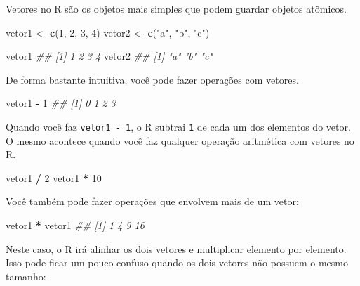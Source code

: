 \documentclass[]{book}
\newenvironment{Shaded}{\begin{snugshade}}{\end{snugshade}}
\newcommand{\CommentTok}[1]{\textcolor[rgb]{0.56,0.35,0.01}{\textit{#1}}}
\newcommand{\DecValTok}[1]{\textcolor[rgb]{0.00,0.00,0.81}{#1}}
\newcommand{\KeywordTok}[1]{\textcolor[rgb]{0.13,0.29,0.53}{\textbf{#1}}}
\newcommand{\NormalTok}[1]{#1}
\newcommand{\OperatorTok}[1]{\textcolor[rgb]{0.81,0.36,0.00}{\textbf{#1}}}
\newcommand{\StringTok}[1]{\textcolor[rgb]{0.31,0.60,0.02}{#1}}
\begin{document}
Vetores no R são os objetos mais simples que podem guardar objetos atômicos.

\begin{Shaded}
\begin{Highlighting}[]
\NormalTok{vetor1 <-}\StringTok{ }\KeywordTok{c}\NormalTok{(}\DecValTok{1}\NormalTok{, }\DecValTok{2}\NormalTok{, }\DecValTok{3}\NormalTok{, }\DecValTok{4}\NormalTok{)}
\NormalTok{vetor2 <-}\StringTok{ }\KeywordTok{c}\NormalTok{(}\StringTok{"a"}\NormalTok{, }\StringTok{"b"}\NormalTok{, }\StringTok{"c"}\NormalTok{)}

\NormalTok{vetor1}
\CommentTok{## [1] 1 2 3 4}
\NormalTok{vetor2}
\CommentTok{## [1] "a" "b" "c"}
\end{Highlighting}
\end{Shaded}

De forma bastante intuitiva, você pode fazer operações com vetores.

\begin{Shaded}
\begin{Highlighting}[]
\NormalTok{vetor1 }\OperatorTok{-}\StringTok{ }\DecValTok{1}
\CommentTok{## [1] 0 1 2 3}
\end{Highlighting}
\end{Shaded}

Quando você faz \texttt{vetor1\ -\ 1}, o R subtrai \texttt{1} de cada um dos elementos do vetor. O mesmo acontece quando você faz qualquer operação aritmética com vetores no R.

\begin{Shaded}
\begin{Highlighting}[]
\NormalTok{vetor1 }\OperatorTok{/}\StringTok{ }\DecValTok{2}
\NormalTok{vetor1 }\OperatorTok{*}\StringTok{ }\DecValTok{10}
\end{Highlighting}
\end{Shaded}

Você também pode fazer operações que envolvem mais de um vetor:

\begin{Shaded}
\begin{Highlighting}[]
\NormalTok{vetor1 }\OperatorTok{*}\StringTok{ }\NormalTok{vetor1}
\CommentTok{## [1]  1  4  9 16}
\end{Highlighting}
\end{Shaded}

Neste caso, o R irá alinhar os dois vetores e multiplicar elemento por elemento. Isso pode ficar um pouco confuso quando os dois vetores não possuem o mesmo tamanho:
\end{document}
